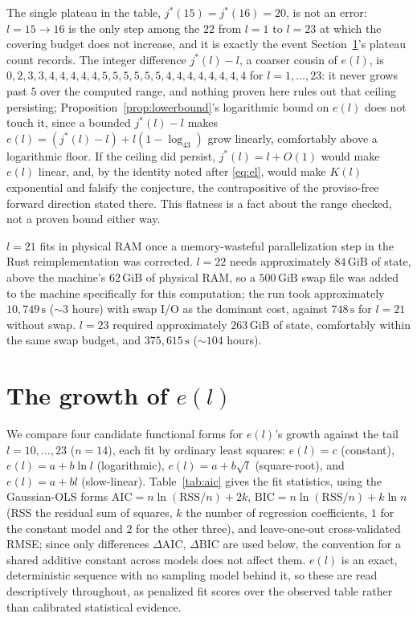 \documentclass[11pt]{amsart}
\theoremstyle{plain}
\theoremstyle{definition}
\theoremstyle{remark}
\begin{document}
The single plateau in the table, $j^*(15)=j^*(16)=20$, is not an error: $l=15\to16$ is the only
step among the $22$ from $l=1$ to $l=23$ at which the covering budget does not increase, and it is
exactly the event Section~\ref{sec:growth}'s plateau count records. The integer difference
$j^*(l)-l$, a coarser cousin of $e(l)$, is $0,2,3,3,4,4,4,4,4,5,5,5,5,5,5,4,4,4,4,4,4,4,4$ for
$l=1,\dots,23$: it never grows past $5$ over the computed range, and nothing proven here rules out
that ceiling persisting; Proposition~\ref{prop:lowerbound}'s logarithmic bound on $e(l)$ does not
touch it, since a bounded $j^*(l)-l$ makes $e(l)=(j^*(l)-l)+l(1-\log_43)$ grow linearly, comfortably
above a logarithmic floor. If the ceiling did persist, $j^*(l)=l+O(1)$ would make $e(l)$ linear, and,
by the identity noted after \eqref{eq:el}, would make $K(l)$ exponential and falsify the conjecture,
the contrapositive of the proviso-free forward direction stated there. This flatness is a fact about
the range checked, not a proven bound either way.

$l=21$ fits in physical RAM once a memory-wasteful parallelization step in the Rust reimplementation
was corrected. $l=22$ needs approximately $84\,\mathrm{GiB}$ of state, above the
machine's $62\,\mathrm{GiB}$ of physical RAM, so a $500\,\mathrm{GiB}$ swap file was added to the
machine specifically for this computation; the run took approximately $10{,}749\,\mathrm{s}$
($\sim\!3$ hours) with swap I/O as
the dominant cost, against $748\,\mathrm{s}$ for $l=21$ without swap. $l=23$ required approximately
$263\,\mathrm{GiB}$ of state, comfortably within the same swap budget, and $375{,}615\,\mathrm{s}$
($\sim\!104$ hours).

\section{The growth of $e(l)$}
\label{sec:growth}

We compare four candidate functional forms for $e(l)$'s growth against the tail $l=10,\dots,23$
($n=14$), each fit by
ordinary least squares: $e(l)=c$ (constant), $e(l)=a+b\ln l$ (logarithmic), $e(l)=a+b\sqrt l$
(square-root), and $e(l)=a+bl$ (slow-linear). Table~\ref{tab:aic} gives the fit statistics, using the
Gaussian-OLS forms $\mathrm{AIC}=n\ln(\mathrm{RSS}/n)+2k$, $\mathrm{BIC}=n\ln(\mathrm{RSS}/n)+k\ln n$
(RSS the residual sum of squares, $k$ the number of regression coefficients, $1$ for the constant
model and $2$ for the other three), and leave-one-out cross-validated RMSE; since only differences
$\Delta\mathrm{AIC}$, $\Delta\mathrm{BIC}$ are used below, the convention for a shared additive
constant across models does not affect them. $e(l)$ is an exact, deterministic sequence with no
sampling model behind it, so these are read descriptively throughout, as penalized fit scores over
the observed table rather than calibrated statistical evidence.
\end{document}
